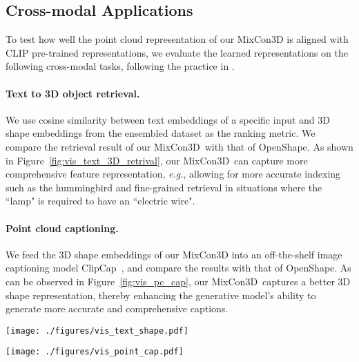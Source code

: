 \documentclass{article} \usepackage{iclr2024_conference,times}
\newcommand{\ourmethod}{MixCon3D}
\begin{document}
\subsection{Cross-modal Applications}
\label{subsec:visualization}

To test how well the point cloud representation of our MixCon3D is aligned with CLIP pre-trained representations, we evaluate the learned representations on the following cross-modal tasks, following the practice in \citet{openshape}. 

\paragraph{Text to 3D object retrieval.}
We use cosine similarity between text embeddings of a specific input and 3D shape embeddings from the ensembled dataset as the ranking metric. We compare the retrieval result of our \ourmethod~with that of OpenShape. As shown in Figure~\ref{fig:vis_text_3D_retrival}, our \ourmethod~can capture more comprehensive feature representation, \textit{e.g.}, allowing for more accurate indexing such as the hummingbird and fine-grained retrieval in situations where the ``lamp" is required to have an ``electric wire".

\paragraph{Point cloud captioning.}
We feed the 3D shape embeddings of our MixCon3D into an off-the-shelf image captioning model ClipCap~\citep{mokady2021clipcap}, and compare the results with that of OpenShape. 
As can be observed in Figure~\ref{fig:vis_pc_cap}, our \ourmethod~captures a better 3D shape representation, thereby enhancing the generative model's ability to generate more accurate and comprehensive captions.  

\begin{figure*}[t!]
  \centering
  \texttt{[image: ./figures/vis\_text\_shape.pdf]}
  \vspace{-1em}
   \caption{\textbf{Text to 3D object retrieval comparisons.}
The input text and the first three retrieved 3D objects are listed in each column for both OpenShape and our \ourmethod.
}
   \label{fig:vis_text_3D_retrival}
\end{figure*}


\begin{figure*}[t]
  \centering
  \texttt{[image: ./figures/vis\_point\_cap.pdf]}
  \vspace{-1.5em}
   \caption{\textbf{Point cloud captioning comparisons.}
   In each row, we list the input point cloud, corresponding images, and generated captions by OpenShape and \ourmethod.
}
   \label{fig:vis_pc_cap}
\end{figure*}
\end{document}
